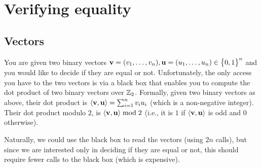 \makeatletter
{}
\makeatother
\ifx\bookMode\undefined%
\fi




\ChapterPrefix{}
\ChapterGen{}




\section{Verifying equality}

\subsection{Vectors}

You are given two binary vectors
$\mathbf{v} = (v_1, \ldots, v_n), \mathbf{u} = (u_1, \ldots, u_n) \in
\left\{ {\bigl. 0,1} \right\}^n$ and you would like to decide if they are equal or
not. Unfortunately, the only access you have to the two vectors is via
a black box that enables you to compute the dot product of two binary
vectors over $\mathbb{Z}_2$. Formally, given two binary vectors as above,
their dot product is $\left\langle {{\mathbf{v}},{\mathbf{u}}} \right\rangle = \sum_{i=1}^n v_i u_i$
(which is a non-negative integer). Their dot product modulo
$2$, is \;$\left\langle {{\mathbf{v}},{\mathbf{u}}} \right\rangle \bmod 2$\; (i.e., it is $1$ if
$\left\langle {{\mathbf{v}},{\mathbf{u}}} \right\rangle$ is odd and $0$ otherwise).

Naturally, we could use the black box to read the vectors (using
$2n$ calls), but since we are interested only in deciding if they are
equal or not, this should require fewer calls to the black box (which
is expensive).

